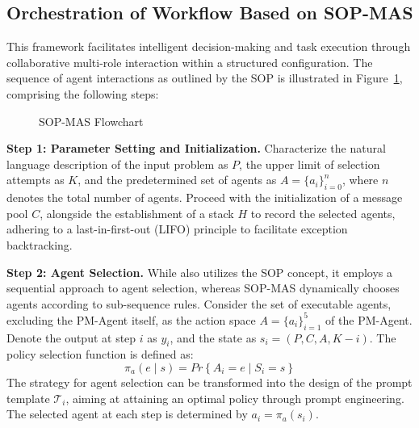 \documentclass[preprint,12pt]{elsarticle}
\begin{document}
\subsection{Orchestration of Workflow Based on SOP-MAS}

This framework facilitates intelligent decision-making and task execution through collaborative multi-role interaction within a structured configuration. The sequence of agent interactions as outlined by the SOP is illustrated in Figure~\ref{fig1}, comprising the following steps:

\begin{figure}[t]%
\centering%
\caption{SOP-MAS Flowchart}\label{fig1}
\end{figure}


\medskip
\noindent\textbf{Step 1: Parameter Setting and Initialization.}
Characterize the natural language description of the input problem as $P$, the upper limit of selection attempts as $K$, and the predetermined set of agents as $A=\{a_i\}_{i=0}^n$, where $n$ denotes the total number of agents. Proceed with the initialization of a message pool $C$, alongside the establishment of a stack $H$ to record the selected agents, adhering to a last-in-first-out (LIFO) principle to facilitate exception backtracking.

\medskip
\noindent\textbf{Step 2: Agent Selection.} While \cite{hongMetaGPTMetaProgramming2024d} also utilizes the SOP concept, it employs a sequential approach to agent selection, whereas SOP-MAS dynamically chooses agents according to sub-sequence rules. Consider the set of executable agents, excluding the PM-Agent itself, as the action space $A=\{a_i\}_{i=1}^5$ of the PM-Agent. Denote the output at step $i$ as $y_i$, and the state as $s_i=(P,C,A,K-i)$. The policy selection function is defined as:
\begin{equation}
\pi_a\left(e\mid s\right)=Pr\left\{A_i=e \mid S_i=s\right\}
\end{equation}
The strategy for agent selection can be transformed into the design of the prompt template $\mathcal{T}_i$, aiming at attaining an optimal policy through prompt engineering. The selected agent at each step is determined by $a_i=\pi_a\left(s_i\right)$.
\end{document}
